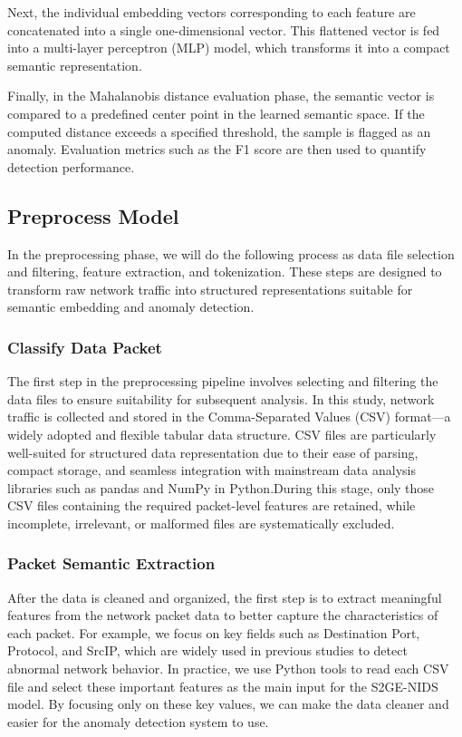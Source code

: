 \begin{ZhChapter}
Next, the individual embedding vectors corresponding to each feature are concatenated into a single one-dimensional vector. This flattened vector is fed into a multi-layer perceptron (MLP) model, which transforms it into a compact semantic representation.

Finally, in the Mahalanobis distance evaluation phase, the semantic vector is compared to a predefined center point in the learned semantic space. If the computed distance exceeds a specified threshold, the sample is flagged as an anomaly. Evaluation metrics such as the F1 score are then used to quantify detection performance.

\subsection{Preprocess Model}
In the preprocessing phase, we will do the following process as data file selection and filtering, feature extraction, and tokenization. These steps are designed to transform raw network traffic into structured representations suitable for semantic embedding and anomaly detection. 

\subsubsection{Classify Data Packet}

The first step in the preprocessing pipeline involves selecting and filtering the data files to ensure suitability for subsequent analysis. In this study, network traffic is collected and stored in the Comma-Separated Values (CSV) format—a widely adopted and flexible tabular data structure. CSV files are particularly well-suited for structured data representation due to their ease of parsing, compact storage, and seamless integration with mainstream data analysis libraries such as pandas and NumPy in Python.During this stage, only those CSV files containing the required packet-level features are retained, while incomplete, irrelevant, or malformed files are systematically excluded. 

\subsubsection{Packet Semantic Extraction}

After the data is cleaned and organized, the first step is to extract meaningful features from the network packet data to better capture the characteristics of each packet. For example, we focus on key fields such as Destination Port, Protocol, and SrcIP, which are widely used in previous studies to detect abnormal network behavior. 
In practice, we use Python tools to read each CSV file and select these important features as the main input for the S2GE-NIDS model. By focusing only on these key values, we can make the data cleaner and easier for the anomaly detection system to use.


\end{ZhChapter}

